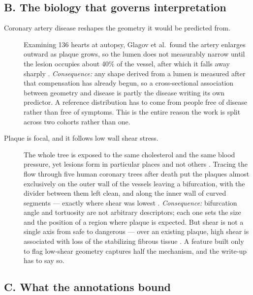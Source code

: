 \subsection*{B. The biology that governs interpretation}

\begin{description}

\item[Coronary artery disease reshapes the geometry it would be predicted from.]
Examining 136 hearts at autopsy, Glagov et al.\ found the artery enlarges outward as plaque grows,
so the lumen does not measurably narrow until the lesion occupies about 40\% of the vessel, after
which it falls away sharply \cite{glagov1987remodeling}.
\textit{Consequence:} any shape derived from a lumen is measured after that compensation has already
begun, so a cross-sectional association between geometry and disease is partly the disease writing
its own predictor. A reference distribution has to come from people free of disease rather than
free of symptoms. This is the entire reason the work is split across two cohorts rather than one.

\item[Plaque is focal, and it follows low wall shear stress.]
The whole tree is exposed to the same cholesterol and the same blood pressure, yet lesions form in
particular places and not others \cite{chatzizisis2007ess}.
Tracing the flow through five human coronary trees after death put the plaques almost exclusively on
the outer wall of the vessels leaving a bifurcation, with the divider between them left clean, and
along the inner wall of curved segments --- exactly where shear was lowest \cite{asakura1990flow}.
\textit{Consequence:} bifurcation angle and tortuosity are not arbitrary descriptors; each one sets
the size and the position of a region where plaque is expected. But shear is not a single axis from
safe to dangerous --- over an existing plaque, high shear is associated with loss of the stabilizing
fibrous tissue \cite{bajraktari2021highwss}. A feature built only to flag low-shear geometry
captures half the mechanism, and the write-up has to say so.

\end{description}

\subsection*{C. What the annotations bound}

